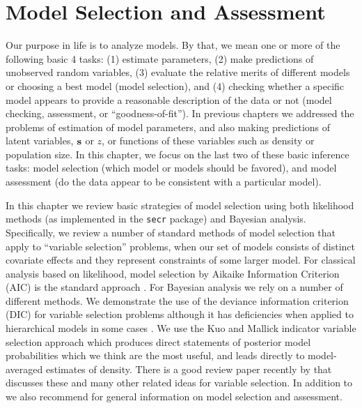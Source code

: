 \chapter{
Model Selection and Assessment
}
\label{chapt.gof}

\vspace{.3in}

Our purpose in life is to analyze models. By that, we mean one or more
of the following basic 4 tasks: (1) estimate parameters, (2) make predictions
of unobserved random variables, (3) evaluate the
relative merits of different models or choosing a best model (model
selection), and (4)  checking whether a specific model appears to provide a
reasonable description of the data or not (model checking, assessment,
or ``goodness-of-fit'').  In previous chapters we
addressed the problems of estimation of model parameters, 
and also making
predictions of latent variables, ${\bf s}$ or $z$, or
functions of these variables such as density or population size.
In this chapter, we focus on the last two of these basic
inference tasks: model selection (which model or models should be
favored), and model assessment (do the data appear to be consistent
with a particular model).


In this chapter we review  basic strategies of model selection 
using both likelihood methods (as
implemented in the \mbox{\tt secr} package) and Bayesian
analysis.
Specifically,
we review a number of standard methods of model selection that apply
to ``variable selection'' problems, when our set of models
consists of distinct covariate effects and they represent constraints
of some larger model.
For classical analysis based on likelihood, model selection by Aikaike Information
Criterion (AIC) is the standard approach \citep{burnham_anderson:2002}.  For
Bayesian analysis we rely on a number of different methods.  We
demonstrate the use of the deviance information criterion (DIC)
\citep{spiegelhalter_etal:2002} for variable selection problems
although it has deficiencies when applied to hierarchical models in
some cases \citep{millar:2009}. 
We use the
Kuo and Mallick indicator variable selection approach
\citep{kuo_mallick:1998} which
produces direct statements
of posterior model probabilities which we think are the most useful,
and leads directly to model-averaged estimates of density.  There is a
good review paper recently by \citet{ohara_sillanpaa:2009} that discusses
these and many other related ideas for variable selection.
 In addition to \citet{ohara_sillanpaa:2009} we
also recommend \citet[][Chapt. 7]{link_barker:2010} for general
information on model selection and assessment.

